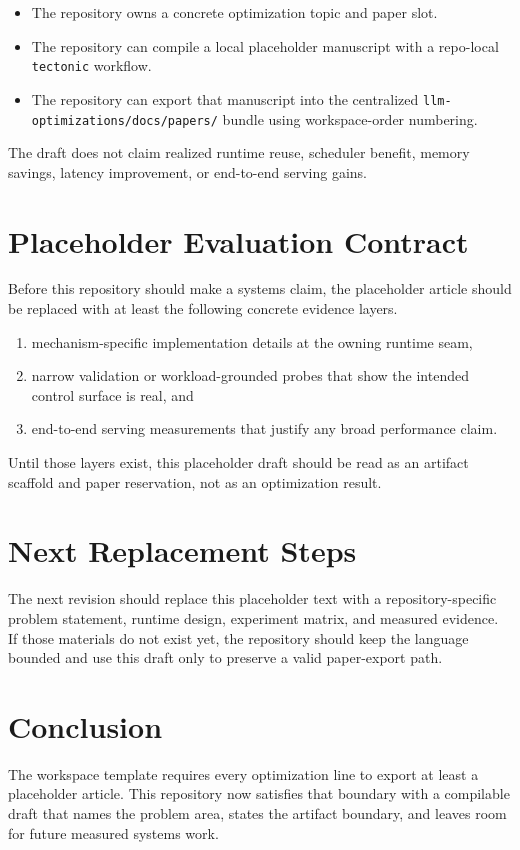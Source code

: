 \documentclass[conference]{IEEEtran}
\begin{document}
\begin{itemize}
\item The repository owns a concrete optimization topic and paper slot.
\item The repository can compile a local placeholder manuscript with a repo-local \texttt{tectonic} workflow.
\item The repository can export that manuscript into the centralized \texttt{llm-optimizations/docs/papers/} bundle using workspace-order numbering.
\end{itemize}

The draft does not claim realized runtime reuse, scheduler benefit, memory savings, latency improvement, or end-to-end serving gains.

\section{Placeholder Evaluation Contract}

Before this repository should make a systems claim, the placeholder article should be replaced with at least the following concrete evidence layers.

\begin{enumerate}
\item mechanism-specific implementation details at the owning runtime seam,
\item narrow validation or workload-grounded probes that show the intended control surface is real, and
\item end-to-end serving measurements that justify any broad performance claim.
\end{enumerate}

Until those layers exist, this placeholder draft should be read as an artifact scaffold and paper reservation, not as an optimization result.

\section{Next Replacement Steps}

The next revision should replace this placeholder text with a repository-specific problem statement, runtime design, experiment matrix, and measured evidence. If those materials do not exist yet, the repository should keep the language bounded and use this draft only to preserve a valid paper-export path.

\section{Conclusion}

The workspace template requires every optimization line to export at least a placeholder article. This repository now satisfies that boundary with a compilable draft that names the problem area, states the artifact boundary, and leaves room for future measured systems work.
\end{document}
